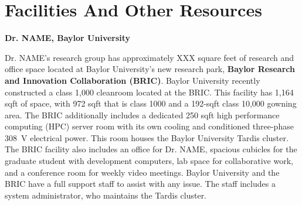 \section*{Facilities And Other Resources}


\noindent\textbf{Dr. NAME, Baylor University}

Dr. NAME's research group has approximately XXX square feet of research and office space located at Baylor University's new research park, \textbf{Baylor Research and Innovation Collaboration (BRIC)}. Baylor University recently constructed a class 1,000 cleanroom located at the BRIC.  This facility has 1,164  sqft of space, with 972 sqft that is class 1000 and a 192-sqft class 10,000 gowning area.  The BRIC additionally includes a dedicated 250 sqft high performance computing (HPC) server room with its own cooling and conditioned three-phase 308~V electrical power. This room houses the Baylor University Tardis cluster. The BRIC facility also includes an office for Dr. NAME, spacious cubicles for the graduate student with development computers, lab space for collaborative work, and a conference room for weekly video meetings. Baylor University and the BRIC have a full support staff to assist with any issue. The staff includes a system administrator, who maintains the Tardis cluster. 